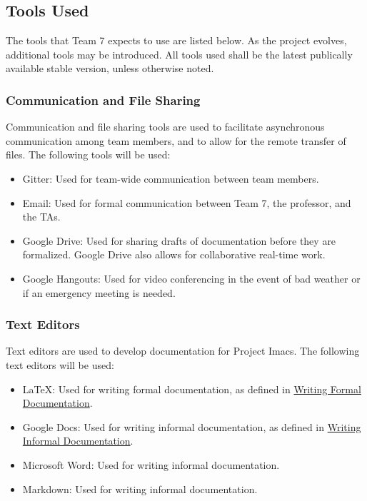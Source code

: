 \documentclass{article}
\begin{document}
\subsection{Tools Used}
The tools that Team 7 expects to use are listed below. As the project evolves, additional tools may be introduced. All tools used shall be the latest publically available stable version, unless otherwise noted.

\subsubsection{Communication and File Sharing}
Communication and file sharing tools are used to facilitate asynchronous communication among team members, and to allow for the remote transfer of files. The following tools will be used:

\begin{itemize}
\item Gitter: Used for team-wide communication between team members.
\item Email: Used for formal communication between Team 7, the professor, and the TAs.
\item Google Drive: Used for sharing drafts of documentation before they are formalized. Google Drive also allows for collaborative real-time work.
\item Google Hangouts: Used for video conferencing in the event of bad weather or if an emergency meeting is needed.
\end{itemize}

\subsubsection{Text Editors}
Text editors are used to develop documentation for Project Imacs. The following text editors will be used:

\begin{itemize}
\item LaTeX: Used for writing formal documentation, as defined in \hyperref[sec:formal-documentation]{Writing Formal Documentation}.
\item Google Docs: Used for writing informal documentation, as defined in \hyperref[sec:informal-documentation]{Writing Informal Documentation}.
\item Microsoft Word: Used for writing informal documentation.
\item Markdown: Used for writing informal documentation.
\end{itemize}
\end{document}

